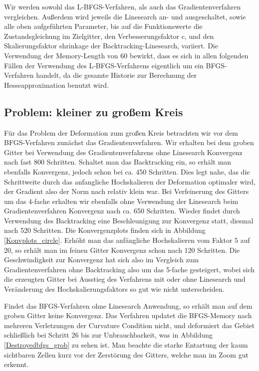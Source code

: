 Wir werden sowohl das L-BFGS-Verfahren, als auch das Gradientenverfahren vergleichen. Außerdem wird jeweils die Linesearch an- und ausgeschaltet, sowie alle oben aufgeführten Parameter, bis auf die Funktionswerte die Zustandsgleichung im Zielgitter, den Verbesserungsfaktor \textsf{c}, und den Skalierungsfaktor \textsf{shrinkage} der Backtracking-Linesearch, variiert. Die Verwendung der Memory-Length von 60 bewirkt, dass es sich in allen folgenden Fällen der Verwendung des L-BFGS-Verfahrens eigentlich um ein BFGS-Verfahren handelt, da die gesamte Historie zur Berechnung der Hesseapproximation benutzt wird. 

\subsection{Problem: kleiner zu großem Kreis}\label{subsect_circle}

Für das Problem der Deformation zum großen Kreis betrachten wir vor dem BFGS-Verfahren zunächst das Gradientenverfahren. Wir erhalten bei dem groben Gitter 
bei Verwendung des Gradientenverfahrens ohne Linesearch Konvergenz nach fast 800 Schritten. Schaltet man das Backtracking ein, so erhält man ebenfalls Konvergenz, jedoch schon bei ca. 450 Schritten. Dies legt nahe, das die Schrittweite durch das anfangliche Hochskalieren der Deformation optimaler wird, der Gradient also der Norm nach relativ klein war. Bei Verfeinerung des Gitters um das 4-fache erhalten wir ebenfalls ohne Verwendung der Linesearch beim Gradientenverfahren Konvergenz nach ca. 650 Schritten. Wieder findet durch Verwendung des Backtracking eine Beschleunigung zur Konvergenz statt, diesmal nach 520 Schritten. Die Konvergenzplots finden sich in Abbildung \ref{Konvplots_circle}. Erhöht man das anfängliche Hochskalieren vom Faktor 5 auf 20, so erhält man im feinen Gitter Konvergenz schon nach 120 Schritten. Die Geschwindigkeit zur Konvergenz hat sich also im Vergleich zum Gradientenverfahren ohne Backtracking also um das 5-fache gesteigert, wobei sich die erzeugten Gitter bei Ausstieg des Verfahrens mit oder ohne Linesearch und Veränderung des Hochskalierungsfaktors so gut wie nicht unterscheiden. 

Findet das BFGS-Verfahren ohne Linesearch Anwendung, so erhält man auf dem groben Gitter keine Konvergenz. Das Verfahren updatet die BFGS-Memory nach mehreren Verletzungen der Curvature Condition nicht, und deformiert das Gebiet schließlich bei Schritt 26 bis zur Unbrauchbarkeit, was in Abbildung \ref{Destroyedbfgs_grob} zu sehen ist. Man beachte die starke Entartung der kaum sichtbaren Zellen kurz vor der Zerstörung des Gitters, welche man im Zoom gut erkennt.


